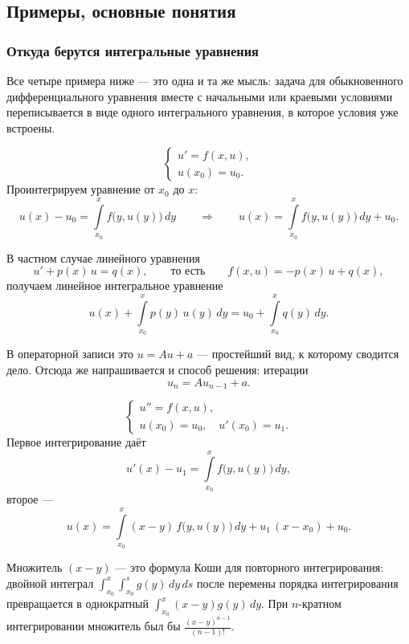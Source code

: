 \subsection{Примеры, основные понятия}

\subsubsection*{Откуда берутся интегральные уравнения}

Все четыре примера ниже — это одна и та же мысль: задача для обыкновенного
дифференциального уравнения вместе с начальными или краевыми условиями
переписывается в виде одного интегрального уравнения, в которое условия уже
встроены.

\begin{example}
\[
  \begin{cases}
    u' = f(x,u), \\
    u(x_0) = u_0 .
  \end{cases}
\]
Проинтегрируем уравнение от $x_0$ до $x$:
\[
  u(x) - u_0 = \int\limits_{x_0}^{x} f\big(y, u(y)\big)\, dy
  \qquad\Longrightarrow\qquad
  u(x) = \int\limits_{x_0}^{x} f\big(y, u(y)\big)\, dy + u_0 .
\]

\medskip
В частном случае линейного уравнения
\[
  u' + p(x)\,u = q(x), \qquad\text{то есть}\qquad f(x,u) = -p(x)\,u + q(x) ,
\]
получаем линейное интегральное уравнение
\[
  u(x) + \int\limits_{x_0}^{x} p(y)\, u(y)\, dy
  = u_0 + \int\limits_{x_0}^{x} q(y)\, dy .
\]
\end{example}

\begin{remark}
В операторной записи это $u = Au + a$ — простейший вид, к которому сводится
дело. Отсюда же напрашивается и способ решения: итерации
\[
  u_n = A u_{n-1} + a .
\]
\end{remark}

\begin{example}
\[
  \begin{cases}
    u'' = f(x,u), \\
    u(x_0) = u_0, \quad u'(x_0) = u_1 .
  \end{cases}
\]
Первое интегрирование даёт
\[
  u'(x) - u_1 = \int\limits_{x_0}^{x} f\big(y,u(y)\big)\, dy ,
\]
второе —
\[
  u(x) = \int\limits_{x_0}^{x} (x-y)\, f\big(y,u(y)\big)\, dy
       + u_1\,(x - x_0) + u_0 .
\]
\end{example}

\begin{idea}
Множитель $(x-y)$ — это формула Коши для повторного интегрирования: двойной
интеграл $\int_{x_0}^{x}\!\int_{x_0}^{s} g(y)\,dy\,ds$ после перемены порядка
интегрирования превращается в однократный $\int_{x_0}^{x}(x-y)g(y)\,dy$. При
$n$-кратном интегрировании множитель был бы
$\frac{(x-y)^{n-1}}{(n-1)!}$.
\end{idea}

